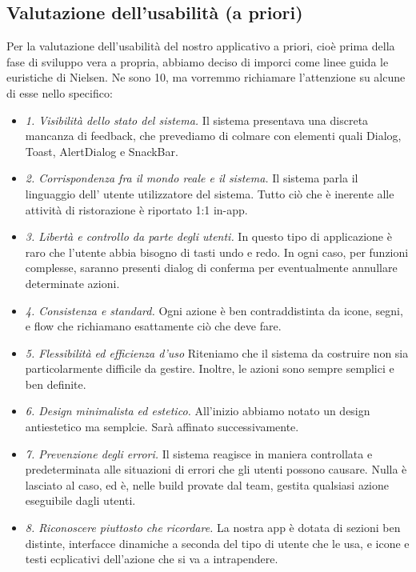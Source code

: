 \subsection{Valutazione dell'usabilità (a priori)}

    \begin{flushleft}
       Per la valutazione dell'usabilità del nostro applicativo a priori, cioè prima della fase di sviluppo vera a propria,
       abbiamo deciso di imporci come linee guida le euristiche di Nielsen.
       Ne sono 10, ma vorremmo richiamare l'attenzione su alcune di esse nello specifico:
        \begin{itemize}
            \item  \emph{1. Visibilità dello stato del sistema.} Il sistema presentava una discreta mancanza di feedback, che prevediamo di colmare con elementi quali Dialog, Toast, AlertDialog e SnackBar.
            \item  \emph{2. Corrispondenza fra il mondo reale e il sistema.} Il sistema parla il linguaggio dell' utente utilizzatore del sistema. Tutto ciò che è inerente alle attività di ristorazione è riportato 1:1 in-app.
            \item  \emph{3. Libertà e controllo da parte degli utenti.} In questo tipo di applicazione è raro che l'utente abbia bisogno di tasti undo e redo. In ogni caso, per funzioni complesse, saranno presenti dialog di conferma per eventualmente annullare determinate azioni.
            \item  \emph{4. Consistenza e standard.} Ogni azione è ben contraddistinta da icone, segni, e flow che richiamano esattamente ciò che deve fare. 
            \item  \emph{5. Flessibilità ed efficienza d’uso} Riteniamo che il sistema da costruire non sia particolarmente difficile da gestire. Inoltre, le azioni sono sempre semplici e ben definite.
            \item  \emph{6. Design minimalista ed estetico.} All'inizio abbiamo notato un design antiestetico ma semplcie. Sarà affinato successivamente.
            \item  \emph{7. Prevenzione degli errori.} Il sistema reagisce in maniera controllata e predeterminata alle situazioni di errori che gli utenti possono causare. Nulla è lasciato al caso, ed è, nelle build provate dal team, gestita qualsiasi azione eseguibile dagli utenti.
            \item  \emph{8. Riconoscere piuttosto che ricordare.} La nostra app è dotata di sezioni ben distinte, interfacce dinamiche a seconda del tipo di utente che le usa, e icone e testi ecplicativi dell'azione che si va a intrapendere.

\end{itemize}
\end{flushleft}
